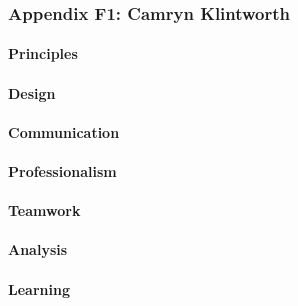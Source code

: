 \documentclass[../../main.tex]{subfiles}
\begin{document}
\subsubsection{Appendix F1: Camryn Klintworth}

\paragraph{Principles}


\paragraph{Design}


\paragraph{Communication}


\paragraph{Professionalism}


\paragraph{Teamwork}


\paragraph{Analysis}


\paragraph{Learning}
\end{document}
